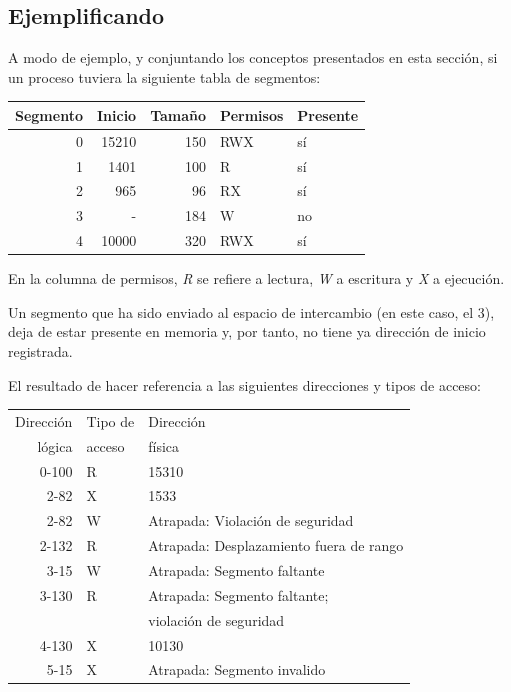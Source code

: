 \documentclass[11pt,fleqn]{book} %
\begin{document}
\subsection{Ejemplificando}
\label{sec-5-3-3}


A modo de ejemplo, y conjuntando los conceptos presentados en esta
sección, si un proceso tuviera la siguiente tabla de segmentos:


\begin{center}
\begin{tabular}{rrrll}
 Segmento  &  Inicio  &  Tamaño  &  Permisos  &  Presente  \\
\hline
        0  &   15210  &     150  &  RWX       &  sí        \\
        1  &    1401  &     100  &  R         &  sí        \\
        2  &     965  &      96  &  RX        &  sí        \\
        3  &       -  &     184  &  W         &  no        \\
        4  &   10000  &     320  &  RWX       &  sí        \\
\end{tabular}
\end{center}



En la columna de permisos, \emph{R} se refiere a lectura, \emph{W} a escritura y
\emph{X} a ejecución.

Un segmento que ha sido enviado al espacio de intercambio (en este
caso, el 3), deja de estar presente en memoria y, por tanto, no tiene
ya dirección de inicio registrada.

El resultado de hacer referencia a las siguientes direcciones y
tipos de acceso:


\begin{center}
\begin{tabular}{rll}
 Dirección  &  Tipo de  &  Dirección                                \\
    lógica  &  acceso   &  física                                   \\
\hline
     0-100  &  R        &  15310                                    \\
      2-82  &  X        &  1533                                     \\
      2-82  &  W        &  Atrapada: Violación de seguridad         \\
     2-132  &  R        &  Atrapada: Desplazamiento fuera de rango  \\
      3-15  &  W        &  Atrapada: Segmento faltante              \\
     3-130  &  R        &  Atrapada: Segmento faltante;             \\
            &           &  violación de seguridad                   \\
     4-130  &  X        &  10130                                    \\
      5-15  &  X        &  Atrapada: Segmento invalido              \\
\end{tabular}
\end{center}
\end{document}

